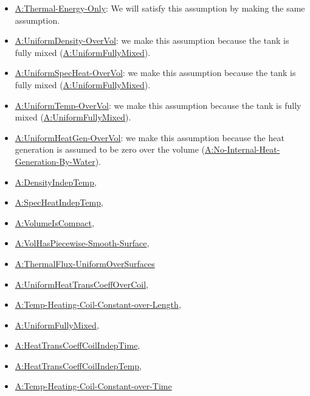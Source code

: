 \documentclass[12pt]{article}
\begin{document}
\begin{itemize}
\item \hyperref[assumpTEO]{A:Thermal-Energy-Only}: We will satisfy this
assumption by making the same assumption.
\item \hyperref[assumpUnifDens]{A:UniformDensity-OverVol}: we make this assumption because the tank is fully mixed (\hyperref[assumpFullyMixed]{A:UniformFullyMixed}).
\item \hyperref[assumpUnifSpecHeat]{A:UniformSpecHeat-OverVol}: we make this assumption because the tank is fully mixed (\hyperref[assumpFullyMixed]{A:UniformFullyMixed}).
\item \hyperref[assumpUnifTemp]{A:UniformTemp-OverVol}: we make this assumption because the tank is fully mixed (\hyperref[assumpFullyMixed]{A:UniformFullyMixed}).
\item \hyperref[assumpUnifHeatGen]{A:UniformHeatGen-OverVol}: we make this
assumption because the heat generation is assumed to be zero over the volume
(\hyperref[assumpNIHGBW]{A:No-Internal-Heat-Generation-By-Water}).
\item \hyperref[assumpDensIndepT]{A:DensityIndepTemp},
\item \hyperref[assumpSpecHeatIndepT]{A:SpecHeatIndepTemp},
\item \hyperref[assumpPiecewiseSmooth]{A:VolumeIsCompact},
\item \hyperref[assumpPiecewiseSmooth]{A:VolHasPiecewise-Smooth-Surface},
\item \hyperref[assumpUnifThermFlux]{A:ThermalFlux-UniformOverSurfaces}
\item \hyperref[assumpUnifHeatTransCoeffCoil]{A:UniformHeatTransCoeffOverCoil}, 
\item \hyperref[assumpTHCCoL]{A:Temp-Heating-Coil-Constant-over-Length}, 
\item \hyperref[assumpFullyMixed]{A:UniformFullyMixed}, 
\item \hyperref[assumpHeatTransCoilIndepTime]{A:HeatTransCoeffCoilIndepTime}, 
\item \hyperref[assumpHeatTransCoilIndepTemp]{A:HeatTransCoeffCoilIndepTemp}, 
\item \hyperref[assumpTHCCoT]{A:Temp-Heating-Coil-Constant-over-Time}
\end{itemize}

\end{document}
